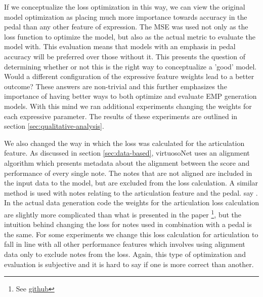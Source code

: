 If we conceptualize the loss optimization in this way, we can view the original model optimization as placing much more importance towards accuracy in the pedal than any other feature of expression. The MSE was used not only as the loss function to optimize the model, but also as the actual metric to evaluate the model with. This evaluation means that models with an emphasis in pedal accuracy will be preferred over those without it. This presents the question of determining whether or not this is the right way to conceptualize a 'good' model. Would a different configuration of the expressive feature weights lead to a better outcome? These answers are non-trivial and this further emphasizes the importance of having better ways to both optimize and evaluate EMP generation models. With this mind we ran additional experiments changing the weights for each expressive parameter. The results of these experiments are outlined in section \ref{sec:qualitative-analysis}. 

We also changed the way in which the loss was calculated for the articulation feature. As discussed in section \ref{sec:data-based}, virtuosoNet uses an alignment algorithm which presents metadata about the alignment between the score and performance of every single note. The notes that are not aligned are included in the input data to the model, but are excluded from the loss calculation. A similar method is used with notes relating to the articulation feature and the pedal. \citet{jeong2019virtuosonet} say . In the actual data generation code the weights for the articulation loss calculation are slightly more complicated than what is presented in the paper \footnote{See \href{https://github.com/jdasam/pyScoreParser/blob/1d36e6f4f46d835f3ad08fea66892f475ac08dd9/xml_matching.py\#L323}{github}}, but the intuition behind changing the loss for notes used in combination with a pedal is the same. For some experiments we change this loss calculation for articulation to fall in line with all other performance features which involves using alignment data only to exclude notes from the loss. Again, this type of optimization and evaluation is subjective and it is hard to say if one is more correct than another. 


